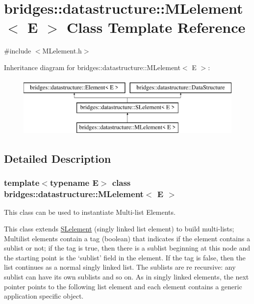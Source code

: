 \hypertarget{classbridges_1_1datastructure_1_1_m_lelement}{}\section{bridges\+:\+:datastructure\+:\+:M\+Lelement$<$ E $>$ Class Template Reference}
\label{classbridges_1_1datastructure_1_1_m_lelement}


{\ttfamily \#include $<$M\+Lelement.\+h$>$}

Inheritance diagram for bridges\+:\+:datastructure\+:\+:M\+Lelement$<$ E $>$\+:\begin{figure}[H]
\begin{center}
\leavevmode
\includegraphics[height=3.000000cm]{classbridges_1_1datastructure_1_1_m_lelement}
\end{center}
\end{figure}


\subsection{Detailed Description}
\subsubsection*{template$<$typename E$>$\newline
class bridges\+::datastructure\+::\+M\+Lelement$<$ E $>$}

This class can be used to instantiate Multi-\/list Elements. 

This class extends \mbox{\hyperlink{classbridges_1_1datastructure_1_1_s_lelement}{S\+Lelement}} (singly linked list element) to build multi-\/lists; Multilist elements contain a tag (boolean) that indicates if the element contains a sublist or not; if the tag is true, then there is a sublist beginning at this node and the starting point is the `sublist' field in the element. If the tag is false, then the list continues as a normal singly linked list. The sublists are re recursive\+: any sublist can have its own sublists and so on. As in singly linked elements, the next pointer points to the following list element and each element contains a generic application specific object.

